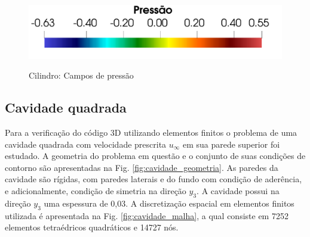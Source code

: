 \documentclass[tese_patricia]{subfiles}%
\begin{document}
\begin{figure}[htb!]
	 \\
	{\includegraphics[trim=0cm 0cm 0cm 0cm,clip=true,scale=0.3]{Imagens/Cap2/cilindro_legendaPress.pdf}} \\
	\caption{Cilindro: Campos de pressão}
	\label{fig:cilindro_camposPressao}
\end{figure}


\subsection{Cavidade quadrada} \label{capitulo:Cap2:VerApl:CavQuad}

Para a verificação do código 3D utilizando elementos finitos o problema de uma cavidade quadrada com velocidade prescrita $u_{\infty}$ em sua parede superior foi estudado. A geometria do problema em questão e o conjunto de suas condições de contorno são apresentadas na Fig. \ref{fig:cavidade_geometria}. As paredes da cavidade são rígidas, com paredes laterais e do fundo com condição de aderência, e adicionalmente, condição de simetria na direção $y_3$. A cavidade possui na direção $y_3$ uma espessura de 0,03. A discretização espacial em elementos finitos utilizada é apresentada na Fig.  \ref{fig:cavidade_malha}, a qual consiste em 7252 elementos tetraédricos quadráticos e 14727 nós.
\end{document}
